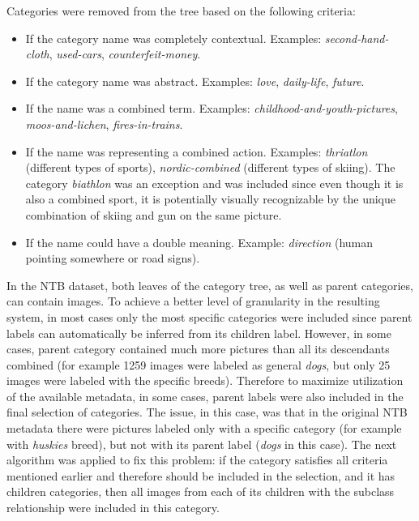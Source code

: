     Categories were removed from the tree based on the following criteria:
    \begin{itemize}
        \item If the category name was completely contextual. Examples: \textit{second-hand-cloth}, \textit{used-cars}, \textit{counterfeit-money}.
        \item If the category name was abstract. Examples: \textit{love}, \textit{daily-life}, \textit{future}.
        \item If the name was a combined term. Examples: \textit{childhood-and-youth-pictures}, \textit{moos-and-lichen}, \textit{fires-in-trains}. %
        \item If the name was representing a combined action. Examples: \textit{thriatlon} (different types of sports), \textit{nordic-combined} (different types of skiing). The category \textit{biathlon} was an exception and was included since even though it is also a combined sport, it is potentially visually recognizable by the unique combination of skiing and gun on the same picture.
        \item If the name could have a double meaning. Example: \textit{direction} (human pointing somewhere or road signs).
    \end{itemize}
    
    In the NTB dataset, both leaves of the category tree, as well as parent categories, can contain images. To achieve a better level of granularity in the resulting system, in most cases only the most specific categories were included since parent labels can automatically be inferred from its children label. However, in some cases, parent category contained much more pictures than all its descendants combined (for example 1259 images were labeled as general \textit{dogs}, but only 25 images were labeled with the specific breeds). Therefore to maximize utilization of the available metadata, in some cases, parent labels were also included in the final selection of categories. The issue, in this case, was that in the original NTB metadata there were pictures labeled only with a specific category (for example with \textit{huskies} breed), but not with its parent label (\textit{dogs} in this case). The next algorithm was applied to fix this problem: if the category satisfies all criteria mentioned earlier and therefore should be included in the selection, and it has children categories, then all images from each of its children with the subclass relationship were included in this category.
    
